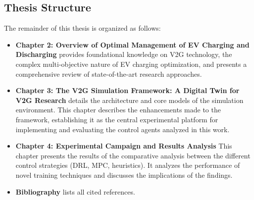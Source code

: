 \newpage
\subsection{Thesis Structure}
The remainder of this thesis is organized as follows:
\begin{itemize}
    \item \textbf{Chapter 2: Overview of Optimal Management of EV Charging and Discharging} provides foundational knowledge on V2G technology, the complex multi-objective nature of EV charging optimization, and presents a comprehensive review of state-of-the-art research approaches.

    \item \textbf{Chapter 3: The V2G Simulation Framework: A Digital Twin for V2G Research} details the architecture and core models of the simulation environment. This chapter describes the enhancements made to the framework, establishing it as the central experimental platform for implementing and evaluating the control agents analyzed in this work.

    \item \textbf{Chapter 4: Experimental Campaign and Results Analysis } This chapter presents the results of the comparative analysis between the different control strategies (DRL, MPC, heuristics). It analyzes the performance of novel training techniques and discusses the implications of the findings. %

    \item \textbf{Bibliography} lists all cited references.
\end{itemize}